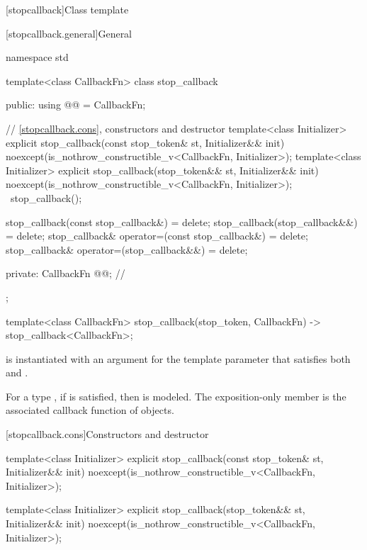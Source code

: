 [stopcallback]{Class template }%
%

[stopcallback.general]{General}

\pnum
{}%
\begin{codeblock}
namespace std {
  template<class CallbackFn>
  class stop_callback {
  public:
    using @@ = CallbackFn;

    // \ref{stopcallback.cons}, constructors and destructor
    template<class Initializer>
      explicit stop_callback(const stop_token& st, Initializer&& init)
        noexcept(is_nothrow_constructible_v<CallbackFn, Initializer>);
    template<class Initializer>
      explicit stop_callback(stop_token&& st, Initializer&& init)
        noexcept(is_nothrow_constructible_v<CallbackFn, Initializer>);
    ~stop_callback();

    stop_callback(const stop_callback&) = delete;
    stop_callback(stop_callback&&) = delete;
    stop_callback& operator=(const stop_callback&) = delete;
    stop_callback& operator=(stop_callback&&) = delete;

  private:
    CallbackFn @@;                                     // \expos
  };

  template<class CallbackFn>
    stop_callback(stop_token, CallbackFn) -> stop_callback<CallbackFn>;
}
\end{codeblock}

\pnum
\mandates
{} is instantiated with an argument for the
template parameter 
that satisfies both 
and .

\pnum
\remarks
For a type ,
if
is satisfied, then
 is modeled.
The exposition-only  member is
the associated callback function of
 objects.

[stopcallback.cons]{Constructors and destructor}

%
\begin{itemdecl}
template<class Initializer>
  explicit stop_callback(const stop_token& st, Initializer&& init)
    noexcept(is_nothrow_constructible_v<CallbackFn, Initializer>);

template<class Initializer>
  explicit stop_callback(stop_token&& st, Initializer&& init)
    noexcept(is_nothrow_constructible_v<CallbackFn, Initializer>);
\end{itemdecl}

